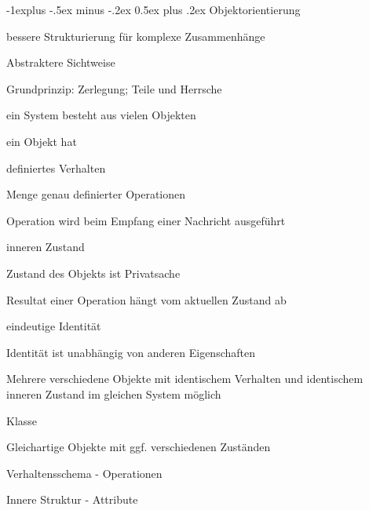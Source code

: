 \documentclass[a4paper]{article}
\makeatletter
\renewcommand{\subsection}{\@startsection{subsection}{2}{0mm}%
                                {-1explus -.5ex minus -.2ex}%
                                {0.5ex plus .2ex}%
                                {\normalfont\normalsize\bfseries}}
\makeatother
\begin{document}
\begin{multicols}{3}
  \subsection{Objektorientierung}
  \begin{itemize*}
    \item bessere Strukturierung für komplexe Zusammenhänge
    \item Abstraktere Sichtweise
    \item Grundprinzip: Zerlegung; Teile und Herrsche
    \item ein System besteht aus vielen Objekten
    \item ein Objekt hat
          \begin{itemize*}
            \item definiertes Verhalten
                  \begin{itemize*}
                    \item Menge genau definierter Operationen
                    \item Operation wird beim Empfang einer Nachricht ausgeführt
                  \end{itemize*}
            \item inneren Zustand
                  \begin{itemize*}
                    \item Zustand des Objekts ist Privatsache
                    \item Resultat einer Operation hängt vom aktuellen Zustand ab
                  \end{itemize*}
            \item eindeutige Identität
                  \begin{itemize*}
                    \item Identität ist unabhängig von anderen Eigenschaften
                    \item Mehrere verschiedene Objekte mit identischem Verhalten und identischem inneren Zustand im gleichen System möglich
                  \end{itemize*}
          \end{itemize*}
    \item Klasse
          \begin{itemize*}
            \item Gleichartige Objekte mit ggf. verschiedenen Zuständen
            \item Verhaltensschema - Operationen
            \item Innere Struktur - Attribute
          \end{itemize*}
  \end{itemize*}


\end{multicols}
\end{document}
